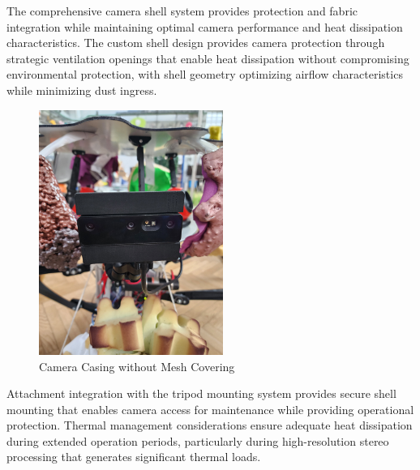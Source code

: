The comprehensive camera shell system provides protection and fabric integration while maintaining optimal camera performance and heat dissipation characteristics. The custom shell design provides camera protection through strategic ventilation openings that enable heat dissipation without compromising environmental protection, with shell geometry optimizing airflow characteristics while minimizing dust ingress.

\begin{figure}[H]
    \centering
    \includegraphics[height=8cm, angle=-90]{Images/CameraCasingNoMesh.jpg}
    \caption{Camera Casing without Mesh Covering}
    \label{fig:camera_casing_no_mesh}
\end{figure}

Attachment integration with the tripod mounting system provides secure shell mounting that enables camera access for maintenance while providing operational protection. Thermal management considerations ensure adequate heat dissipation during extended operation periods, particularly during high-resolution stereo processing that generates significant thermal loads.

